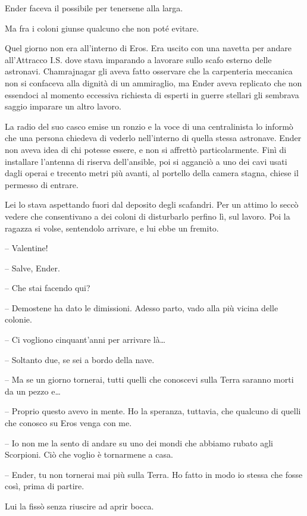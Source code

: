 {Ender faceva il possibile per tenersene alla larga.}

{Ma fra i coloni giunse qualcuno che non poté evitare.}

{Quel giorno non era all'interno di Eros. Era uscito con una navetta per
	andare all'Attracco I.S. dove stava imparando a lavorare sullo scafo
	esterno delle astronavi. Chamrajnagar gli aveva fatto osservare che la
	carpenteria meccanica non si confaceva alla dignità di un ammiraglio, ma
	Ender aveva replicato che non essendoci al momento eccessiva richiesta
	di esperti in guerre stellari gli sembrava saggio imparare un altro
	lavoro.}

{La radio del suo casco emise un ronzio e la voce di una centralinista
	lo informò che una persona chiedeva di vederlo nell'interno di quella
	stessa astronave. Ender non aveva idea di chi potesse essere, e non si
	affrettò particolarmente. Finì di installare l'antenna di riserva
	dell'ansible, poi si agganciò a uno dei cavi usati dagli operai e
	trecento metri più avanti, al portello della camera stagna, chiese il
	permesso di entrare.}

{Lei lo stava aspettando fuori dal deposito degli scafandri. Per un
	attimo lo seccò vedere che consentivano a dei coloni di disturbarlo
	perfino lì, sul lavoro. Poi la ragazza si volse, sentendolo arrivare, e
	lui ebbe un fremito.}

{-- Valentine!}

{-- Salve, Ender.}

{-- Che stai facendo qui?}

{-- Demostene ha dato le dimissioni. Adesso parto, vado alla più vicina
	delle colonie.}

{-- Ci vogliono cinquant'anni per arrivare là\ldots{}}

{-- Soltanto due, se sei a bordo della nave.}

{-- Ma se un giorno tornerai, tutti quelli che conoscevi sulla Terra
	saranno morti da un pezzo e\ldots{}}

{-- Proprio questo avevo in mente. Ho la speranza, tuttavia, che
	qualcuno di quelli che conosco su Eros venga con me.}

{-- Io non me la sento di andare su uno dei mondi che abbiamo rubato
	agli Scorpioni. Ciò che voglio è tornarmene a casa.}

{-- Ender, tu non tornerai mai più sulla Terra. Ho fatto in modo io
	stessa che fosse così, prima di partire.}

{Lui la fissò senza riuscire ad aprir bocca.}

